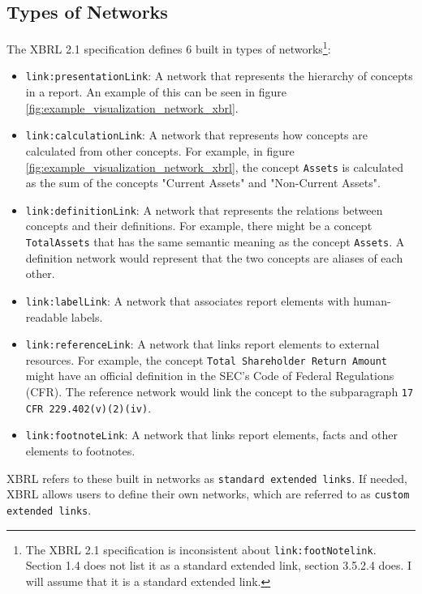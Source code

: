\subsection{Types of Networks}

The XBRL 2.1 specification defines 6 built in types of networks\cite{xbrl21_terminology}\footnote[1]{The XBRL 2.1 specification is inconsistent about \texttt{link:footNotelink}. Section 1.4 does not list it as a standard extended link, section 3.5.2.4 does. I will assume that it is a standard extended link.}:

\begin{itemize}
    \item \texttt{link:presentationLink}: A network that represents the hierarchy of concepts in a report. An example of this can be seen in figure \ref{fig:example_visualization_network_xbrl}.
    \item \texttt{link:calculationLink}: A network that represents how concepts are calculated from other concepts. 
    For example, in figure \ref{fig:example_visualization_network_xbrl}, the concept \texttt{Assets} is calculated as the sum of the concepts "Current Assets" and "Non-Current Assets".
    \item \texttt{link:definitionLink}: A network that represents the relations between concepts and their definitions. 
    For example, there might be a concept \texttt{TotalAssets} that has the same semantic meaning as the concept \texttt{Assets}. 
    A definition network would represent that the two concepts are aliases of each other.
    \item \texttt{link:labelLink}: A network that associates report elements with human-readable labels.
    \item \texttt{link:referenceLink}: A network that links report elements to external resources. 
    For example, the concept \texttt{Total Shareholder Return Amount} might have an official definition in the SEC's Code of Federal Regulations (CFR).
    The reference network would link the concept to the subparagraph \texttt{17 CFR 229.402(v)(2)(iv)}\cite{cfr_total_shareholder_return_amount}.
    \item \texttt{link:footnoteLink}: A network that links report elements, facts and other elements to footnotes.
\end{itemize}

XBRL refers to these built in networks as \texttt{standard extended links}. 
If needed, XBRL allows users to define their own networks, which are referred to as \texttt{custom extended links}\cite{xbrl21_terminology}.

